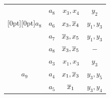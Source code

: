\begin{table}
\begin{center}
\begin{minipage}[t]{190pt}
\begin{tabular}{|c|c|c|c|}
\hline




 & $a_8$ & $x_3,x_4$ & $y_2$ \\






\multicolumn{1}{|c|}{\raisebox{-6pt}[0pt][0pt]{$a_8$}} & $a_6$ & $x_3,\overline x_4$ & $y_1,y_3$ \\






  & $a_7$ & $\overline x_3,x_5$ & $y_1,y_3$ \\






 & $a_8$ & $\overline x_3,\overline x_5$ & $-$ \\


\hline




  & $a_3$ & $x_1,x_3$ & $y_3$ \\






$a_9$ & $a_4$ & $x_1,\overline x_3$ & $y_3,y_5$ \\






 & $a_5$ & $\overline x_1$ & $y_3,y_4$ \\


\hline


\end{tabular}




\end{minipage}




\hspace*{17mm} 




\begin{minipage}[t]{190pt}











\end{minipage}
\end{center}
\end{table}
